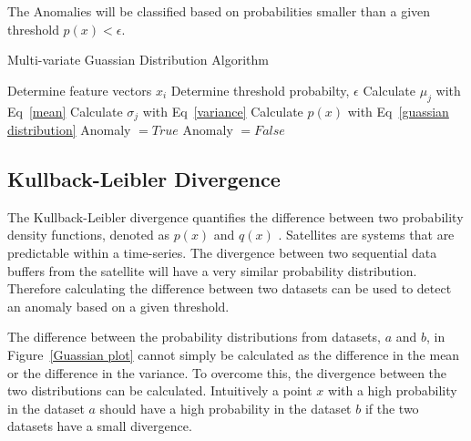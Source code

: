 The Anomalies will be classified based on probabilities smaller than a given threshold $p(x) < \epsilon$.

\begin{algorithm}[!htb]
	\caption[Multi-variate Guassian Distribution]{Multi-variate Guassian Distribution Algorithm}
	\label{alg}
	\begin{algorithmic}[1]
		\State Determine feature vectors $x_i$
		\State Determine threshold probabilty, $\epsilon$
		\State Calculate $\mu_j$ with Eq~\ref{mean}
		\State Calculate $\sigma_j$ with Eq~\ref{variance}
		\State Calculate $p(x)$ with Eq~\ref{guassian distribution}
			\State Anomaly $= True$
		\Else
			\State Anomaly $= False$
		\EndIf
		
	\end{algorithmic}
\end{algorithm}

\subsection{Kullback-Leibler Divergence}
The Kullback-Leibler divergence quantifies the difference between two probability density functions, denoted as $p(x)$ and $q(x)$ \cite{hershey2007approximating}. Satellites are systems that are predictable within a time-series. The divergence between two sequential data buffers from the satellite will have a very similar probability distribution. Therefore calculating the difference between two datasets can be used to detect an anomaly based on a given threshold.

The difference between the probability distributions from datasets, $a$ and $b$, in Figure~\ref{Guassian plot} cannot simply be calculated as the difference in the mean or the difference in the variance. To overcome this, the divergence between the two distributions can be calculated. Intuitively a point $x$ with a high probability in the dataset $a$ should have a high probability in the dataset $b$ if the two datasets have a small divergence. 

